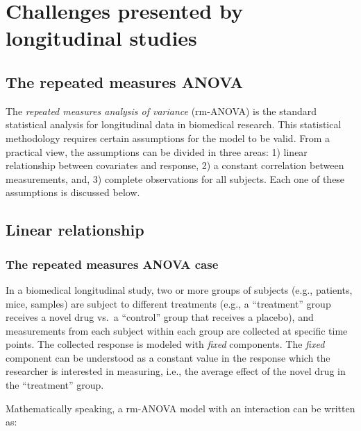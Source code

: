 \documentclass[
]{article}
\begin{document}
\hypertarget{challenges-presented-by-longitudinal-studies}{%
\section{Challenges presented by longitudinal studies}\label{challenges-presented-by-longitudinal-studies}}

\hypertarget{the-repeated-measures-anova}{%
\subsection{The repeated measures ANOVA}\label{the-repeated-measures-anova}}

The \emph{repeated measures analysis of variance} (rm-ANOVA) is the standard statistical analysis for longitudinal data in biomedical research. This statistical methodology requires certain assumptions for the model to be valid. From a practical view, the assumptions can be divided in three areas: 1) linear relationship between covariates and response, 2) a constant correlation between measurements, and, 3) complete observations for all subjects. Each one of these assumptions is discussed below.

\hypertarget{linear-relationship}{%
\subsection{Linear relationship}\label{linear-relationship}}

\hypertarget{the-repeated-measures-anova-case}{%
\subsubsection{The repeated measures ANOVA case}\label{the-repeated-measures-anova-case}}

In a biomedical longitudinal study, two or more groups of subjects (e.g., patients, mice, samples) are subject to different treatments (e.g., a ``treatment'' group receives a novel drug vs.~a ``control'' group that receives a placebo), and measurements from each subject within each group are collected at specific time points. The collected response is modeled with \emph{fixed} components. The \emph{fixed} component can be understood as a constant value in the response which the researcher is interested in measuring, i.e., the average effect of the novel drug in the ``treatment'' group.

Mathematically speaking, a rm-ANOVA model with an interaction can be written as:
\end{document}
